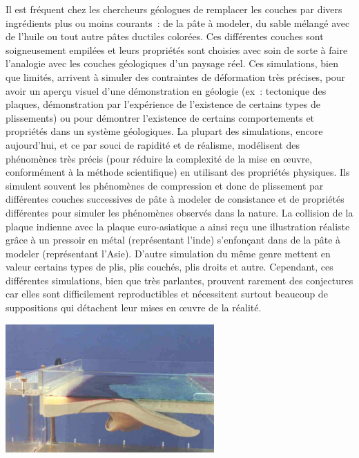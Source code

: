 \documentclass[a4paper,11pt]{article}
\begin{document}
Il est fréquent chez les chercheurs géologues de remplacer les couches par divers ingrédients plus ou moins courants~: de la pâte à modeler, du sable mélangé avec de l'huile ou tout autre pâtes ductiles colorées.
Ces différentes couches sont soigneusement empilées et leurs propriétés sont choisies avec soin de sorte à faire l'analogie avec les couches géologiques d'un paysage réel.
Ces simulations, bien que limités, arrivent à simuler des contraintes de déformation très précises, pour avoir un aperçu visuel d'une démonstration en géologie (ex~: tectonique des plaques, démonstration par l'expérience de l'existence de certains types de plissements) ou pour démontrer l'existence de certains comportements et propriétés dans un système géologiques.
La plupart des simulations, encore aujourd'hui, et ce par souci de rapidité et de réalisme, modélisent des phénomènes très précis (pour réduire la complexité de la mise en œuvre, conformément à la méthode scientifique) en utilisant des propriétés physiques.
Ils simulent souvent les phénomènes de compression et donc de plissement par différentes couches successives de pâte à modeler de consistance et de propriétés différentes pour simuler les phénomènes observés dans la nature.
La collision de la plaque indienne avec la plaque euro-asiatique a ainsi reçu une illustration réaliste grâce à un pressoir en métal (représentant l'inde) s'enfonçant dans de la pâte à modeler (représentant l'Asie).
D'autre simulation du même genre mettent en valeur certains types de plis, plis couchés, plis droits et autre. Cependant, ces différentes simulations, bien que très parlantes, prouvent rarement des conjectures car elles sont difficilement reproductibles et nécessitent surtout beaucoup de suppositions qui détachent leur mises en œuvre de la réalité.

\begin{center}
  \includegraphics[width=8cm]{Images/simulation_physique.png}
\end{center}
\end{document}
